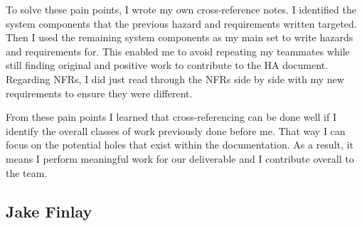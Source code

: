 \documentclass{article}
\newcounter{hazard}
\begin{document}
\begin{enumerate}
  To solve these pain points, I wrote my own cross-reference notes. I identified the 
  system components that the previous hazard and requirements written targeted. Then 
  I used the remaining system components as my main set to write hazards and requirements 
  for. This enabled me to avoid repeating my teammates while still finding original and 
  positive work to contribute to the HA document. Regarding NFRs, I did just read 
  through the NFRs side by side with my new requirements to ensure they were different.

  From these pain points I learned that cross-referencing can be done well if I identify 
  the overall classes of work previously done before me. That way I can focus on the 
  potential holes that exist within the documentation. As a result, it means I perform 
  meaningful work for our deliverable and I contribute overall to the team.
\end{enumerate}

\subsection*{Jake Finlay}
\end{document}

